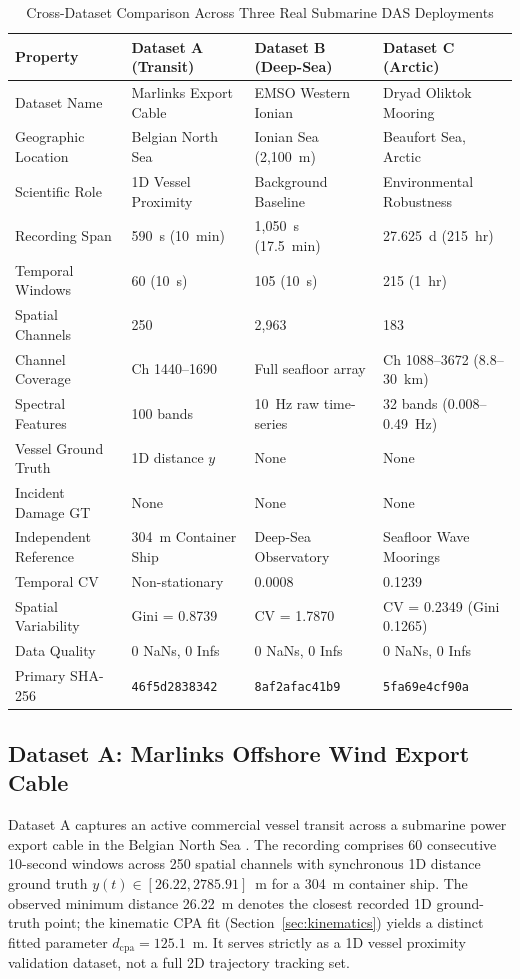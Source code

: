 \documentclass[conference]{IEEEtran}
\begin{document}
\begin{table}[!t]
\caption{Cross-Dataset Comparison Across Three Real Submarine DAS Deployments}
\label{tab:datasets}
\centering
\footnotesize
\begin{tabular}{@{}p{}p{}p{}p{}@{}}
\toprule
Property & Dataset A (Transit) & Dataset B (Deep-Sea) & Dataset C (Arctic) \\
\midrule
Dataset Name & Marlinks Export Cable & EMSO Western Ionian & Dryad Oliktok Mooring \\
Geographic Location & Belgian North Sea & Ionian Sea (2,100~m) & Beaufort Sea, Arctic \\
Scientific Role & 1D Vessel Proximity & Background Baseline & Environmental Robustness \\
Recording Span & 590~s (10~min) & 1,050~s (17.5~min) & 27.625~d (215~hr) \\
Temporal Windows & 60 (10~s) & 105 (10~s) & 215 (1~hr) \\
Spatial Channels & 250 & 2{,}963 & 183 \\
Channel Coverage & Ch 1440--1690 & Full seafloor array & Ch 1088--3672 (8.8--30~km) \\
Spectral Features & 100 bands & 10~Hz raw time-series & 32 bands (0.008--0.49~Hz) \\
Vessel Ground Truth & 1D distance $y$ & None & None \\
Incident Damage GT & None & None & None \\
Independent Reference & 304~m Container Ship & Deep-Sea Observatory & Seafloor Wave Moorings \\
Temporal CV & Non-stationary & 0.0008 & 0.1239 \\
Spatial Variability & Gini = 0.8739 & CV = 1.7870 & CV = 0.2349 (Gini 0.1265) \\
Data Quality & 0 NaNs, 0 Infs & 0 NaNs, 0 Infs & 0 NaNs, 0 Infs \\
Primary SHA-256 & \texttt{46f5d2838342} & \texttt{8af2afac41b9} & \texttt{5fa69e4cf90a} \\
\bottomrule
\end{tabular}
\end{table}

\subsection{Dataset A: Marlinks Offshore Wind Export Cable}
Dataset A captures an active commercial vessel transit across a submarine power
export cable in the Belgian North Sea \cite{b12}. The recording comprises 60
consecutive 10-second windows across 250 spatial channels with synchronous 1D
distance ground truth $y(t) \in [26.22, 2785.91]$~m for a 304~m container ship.
The observed minimum distance 26.22~m denotes the closest recorded 1D ground-truth
point; the kinematic CPA fit (Section~\ref{sec:kinematics}) yields a distinct
fitted parameter $d_{\mathrm{cpa}} = 125.1$~m.
It serves strictly as a 1D vessel proximity validation dataset, not a full 2D
trajectory tracking set.
\end{document}
